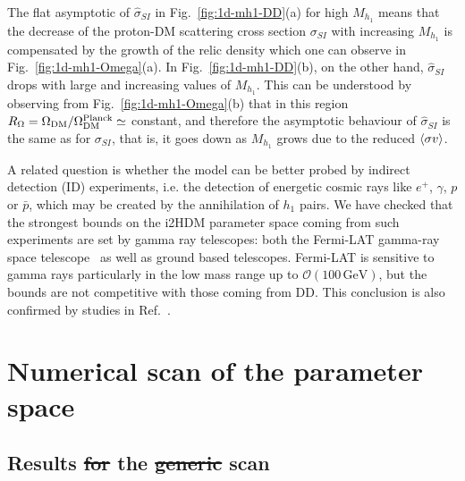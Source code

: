 \documentclass[12pt,a4paper]{article}
\newcommand {\blue} {\color{blue}}
\newcommand{\giac}[2]{{\blue #1 #2}}
\providecommand{\DIFaddtex}[1]{{\protect\color{blue}\uwave{#1}}} %
\providecommand{\DIFdeltex}[1]{{\protect\color{red}\sout{#1}}}                      %
\providecommand{\DIFaddbegin}{} %
\providecommand{\DIFaddend}{} %
\providecommand{\DIFdelbegin}{} %
\providecommand{\DIFdelend}{} %
\providecommand{\DIFadd}[1]{\texorpdfstring{\DIFaddtex{#1}}{#1}} %
\providecommand{\DIFdel}[1]{\texorpdfstring{\DIFdeltex{#1}}{}} %
\begin{document}
The flat asymptotic of $\hat{\sigma}_{SI}$ in Fig.~\ref{fig:1d-mh1-DD}(a)
for high $M_{h_1}$ means that the decrease of the 
proton-DM scattering cross section ${\sigma}_{SI}$ with increasing $M_{h_1}$ is compensated by the 
growth of the relic density which one can observe in Fig.~\ref{fig:1d-mh1-Omega}(a).
{In Fig.~\ref{fig:1d-mh1-DD}(b), on the other hand, $\hat{\sigma}_{SI}$
drops with large and increasing values of $M_{h_1}$.
This can be understood by observing from Fig.~\ref{fig:1d-mh1-Omega}(b) that in this region
$R_\Omega = \Omega_{\rm DM}/\Omega^{\rm Planck}_{\rm DM}\simeq$ constant, and therefore 
the asymptotic behaviour of $\hat{\sigma}_{SI}$ is the same as for ${\sigma}_{SI}$,
that is, it goes down as $M_{h_1}$ grows due to the reduced $\mathinner{\langle{\sigma v}\rangle}$.}




A related question is whether the model can be better probed by   indirect detection (ID) experiments, i.e. the detection of   energetic cosmic rays like $e^+$, $\gamma$, $p$ or $\bar{p}$, which may be created by the annihilation of $h_1$ pairs.
We have checked  that the strongest bounds on the i2HDM parameter space
 coming from such experiments are set by gamma ray telescopes: both the Fermi-LAT gamma-ray space telescope~\cite{Ackermann:2011wa} as well as ground based telescopes. Fermi-LAT is sensitive to gamma rays particularly in the low mass range  up to $\mathcal{O}(100\,\mathrm{GeV})$, but the bounds are not competitive with those coming from DD. 
This conclusion is also confirmed by studies in Ref.~\cite{Arhrib:2013ela}.



%
\section{Numerical scan of the parameter space}

\subsection{Results \DIFdelbegin \DIFdel{for }\DIFdelend \DIFaddbegin \DIFadd{of }\DIFaddend the \DIFdelbegin \DIFdel{generic }\DIFdelend \DIFaddbegin \DIFadd{general }\DIFaddend scan}
\DIFaddbegin 
\end{document}
